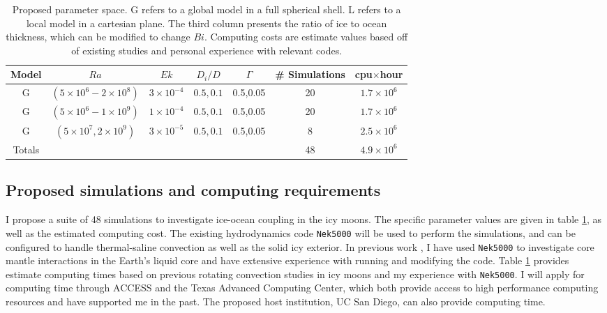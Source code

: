 \documentclass[12pt]{article}
\def\lb{\left(}
\def\rb{\right)}
\begin{document}
\begin{table}
\begin{center}
\begin{tabular}{|c|c|c|c|c|c|c|}
\hline
Model&$Ra$&$Ek$&$D_{i}/D$& $\Gamma$ &\# Simulations & cpu$\times$hour\\
		\hline
G&$\lb 5 \times 10^{6} - 2 \times 10^{8} \rb $ & $3 \times 10^{-4} $ & $0.5,0.1$&0.5,0.05&20&$1.7 \times 10^{6}$\\
  	\hline
G&$\lb 5 \times 10^{6} - 1 \times 10^{9} \rb $ & $1 \times 10^{-4} $ & $0.5,0.1$&0.5,0.05&20&$1.7\times 10^{6}$\\
  	\hline
G&$\lb 5\times 10^{7}, 2 \times 10^{9} \rb $ & $3 \times 10^{-5} $ & $0.5,0.1$&0.5,0.05&8&$2.5\times 10^6$\\
		\hline
		\hline
Totals & && & &48&$4.9 \times 10^6$ \\
		\hline
\end{tabular}
\end{center}
\caption{Proposed parameter space. G refers to a global model in a full spherical shell. L refers to a local model in a cartesian plane. The third column presents the ratio of ice to ocean thickness, which can be modified to change $Bi$. Computing costs are estimate values based off of existing studies \citep{dL23,rM19} and personal experience with relevant codes.}
\label{t:param}
\end{table}


\subsection{Proposed simulations and computing requirements}
I propose a suite of 48 simulations to investigate ice-ocean coupling in the icy moons. The specific parameter values are given in table \ref{t:param}, as well as the estimated computing cost.  The existing hydrodynamics code \texttt{Nek5000} \citep{nek5000} will be used to perform the simulations, and can be configured to handle thermal-saline convection as well as the solid icy exterior.
In previous work \citep{tO25}, I have used \texttt{Nek5000} to investigate core mantle interactions in the Earth's liquid core and have extensive experience with running and modifying the code. Table \ref{t:param} provides estimate computing times based on previous rotating convection studies in icy moons \citep{dL23} and my experience with \texttt{Nek5000}.
 I will apply for computing time through ACCESS and the Texas Advanced Computing Center, which both provide access to high performance computing resources and have supported me in the past. The proposed host institution, UC San Diego, can also provide computing time.
\end{document}
